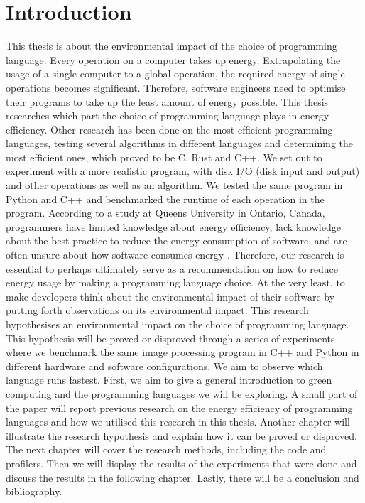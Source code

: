 \chapter{Introduction}
\setcounter{page}{1}

This thesis is about the environmental impact of the choice of programming language. Every operation on a computer takes up energy. Extrapolating the usage of a single computer to a global operation, the required energy of single operations becomes significant. Therefore, software engineers need to optimise their programs to take up the least amount of energy possible. This thesis researches which part the choice of programming language plays in energy efficiency.
Other research has been done on the most efficient programming languages, testing several algorithms in different languages and determining the most efficient ones, which proved to be C, Rust and C++. We set out to experiment with a more realistic program, with disk I/O (disk input and output) and other operations as well as an algorithm. We tested the same program in Python and C++ and benchmarked the runtime of each operation in the program.
According to a study at Queens University in Ontario, Canada, programmers have limited knowledge about energy efficiency, lack knowledge about the best practice to reduce the energy consumption of software, and are often unsure about how software consumes energy \cite{programmers}.
Therefore, our research is essential to perhaps ultimately serve as a recommendation on how to reduce energy usage by making a programming language choice. At the very least, to make developers think about the environmental impact of their software by putting forth observations on its environmental impact.
This research hypothesises an environmental impact on the choice of programming language. This hypothesis will be proved or disproved through a series of experiments where we benchmark the same image processing program in C++ and Python in different hardware and software configurations. We aim to observe which language runs fastest.
First, we aim to give a general introduction to green computing and the programming languages we will be exploring. A small part of the paper will report previous research on the energy efficiency of programming languages and how we utilised this research in this thesis. Another chapter will illustrate the research hypothesis and explain how it can be proved or disproved. The next chapter will cover the research methods, including the code and profilers. Then we will display the results of the experiments that were done and discuss the results in the following chapter. Lastly, there will be a conclusion and bibliography.
